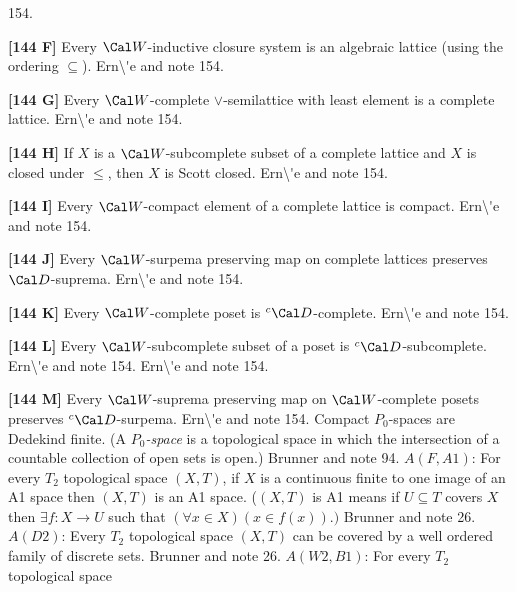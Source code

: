 154.
\smallskip
\item{}{\bf [144 F]} Every $\Cal W$-inductive closure system is
an algebraic lattice (using the ordering $\subseteq$).
\ac{Ern\'e} \cite{2000} and note 154. 
 
\smallskip
\item{}{\bf [144 G]} Every $\Cal W$-complete $\lor$-semilattice
with least element is a complete lattice.  \ac{Ern\'e} \cite{2000} and
note 154.  
\smallskip
\item{}{\bf [144 H]} If $X$ is a $\Cal W$-subcomplete subset of a
complete lattice and $X$ is closed under $\le$, then $X$ is Scott
closed.  \ac{Ern\'e} \cite{2000} and note 154. 
\smallskip
\item{}{\bf [144 I]}  Every $\Cal W$-compact element of a complete
lattice is compact.  \ac{Ern\'e} \cite{2000} and note 154.
\smallskip
\item{}{\bf [144 J]} Every $\Cal W$-surpema preserving map on
complete lattices preserves $\Cal D$-suprema.
\ac{Ern\'e} \cite{2000} and note 154.
\smallskip
\item{}{\bf [144 K]} Every $\Cal W$-complete poset is $^c\Cal
D$-complete.  \ac{Ern\'e} \cite{2000} and note 154.
\smallskip
\item{}{\bf [144 L]}  Every $\Cal W$-subcomplete subset of a poset
is $^c\Cal D$-subcomplete.  \ac{Ern\'e} \cite{2000} and note 154.
\ac{Ern\'e} \cite{2000} and note 154.  
\smallskip
\item{}{\bf [144 M]}  Every $\Cal W$-suprema preserving map on
$\Cal W$-complete posets preserves $^c\Cal D$-surpema.
\ac{Ern\'e} \cite{2000} and note 154.
\medskip
{}  Compact $P_0$-spaces are Dedekind finite. (A
{\it $P_0$-space} is a topological space in which the intersection of a
countable collection of open sets is open.) \ac{Brunner} \cite{1984c} and
note 94.
\medskip
{}  $A(F,A1)$: For every $T_2$ topological space
$(X,T)$, if $X$ is a continuous finite to one image of an A1 space then
$(X,T)$ is  an A1 space. ($(X,T)$ is A1 means if $U \subseteq  T$ covers
$X$ then $\exists f : X\rightarrow U$ such that $(\forall x\in X)
(x\in f(x)).)$  \ac{Brunner} \cite{1983d} and note 26.
\medskip
{}  $A(D2)$:  Every $T_2$ topological space $(X,T)$
can be covered by a well ordered family of discrete sets. \ac{Brunner}
\cite{1983d} and note 26.
\medskip
{} $A(W2,B1)$: For every $T_2$ topological space
